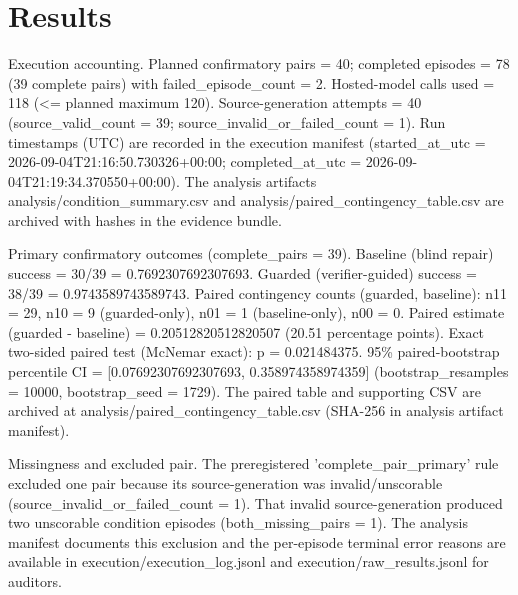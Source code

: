 \documentclass[conference]{IEEEtran}
\begin{document}
\section{Results}
Execution accounting. Planned confirmatory pairs = 40; completed episodes = 78 (39 complete pairs) with failed\_episode\_count = 2. Hosted-model calls used = 118 (<= planned maximum 120). Source-generation attempts = 40 (source\_valid\_count = 39; source\_invalid\_or\_failed\_count = 1). Run timestamps (UTC) are recorded in the execution manifest (started\_at\_utc = 2026-09-04T21:16:50.730326+00:00; completed\_at\_utc = 2026-09-04T21:19:34.370550+00:00). The analysis artifacts analysis/condition\_summary.csv and analysis/paired\_contingency\_table.csv are archived with hashes in the evidence bundle.

Primary confirmatory outcomes (complete\_pairs = 39). Baseline (blind repair) success = 30/39 = 0.7692307692307693. Guarded (verifier-guided) success = 38/39 = 0.9743589743589743. Paired contingency counts (guarded, baseline): n11 = 29, n10 = 9 (guarded-only), n01 = 1 (baseline-only), n00 = 0. Paired estimate (guarded - baseline) = 0.20512820512820507 (20.51 percentage points). Exact two-sided paired test (McNemar exact): p = 0.021484375. 95\% paired-bootstrap percentile CI = [0.07692307692307693, 0.358974358974359] (bootstrap\_resamples = 10000, bootstrap\_seed = 1729). The paired table and supporting CSV are archived at analysis/paired\_contingency\_table.csv (SHA-256 in analysis artifact manifest).

Missingness and excluded pair. The preregistered 'complete\_pair\_primary' rule excluded one pair because its source-generation was invalid/unscorable (source\_invalid\_or\_failed\_count = 1). That invalid source-generation produced two unscorable condition episodes (both\_missing\_pairs = 1). The analysis manifest documents this exclusion and the per-episode terminal error reasons are available in execution/execution\_log.jsonl and execution/raw\_results.jsonl for auditors.
\end{document}
